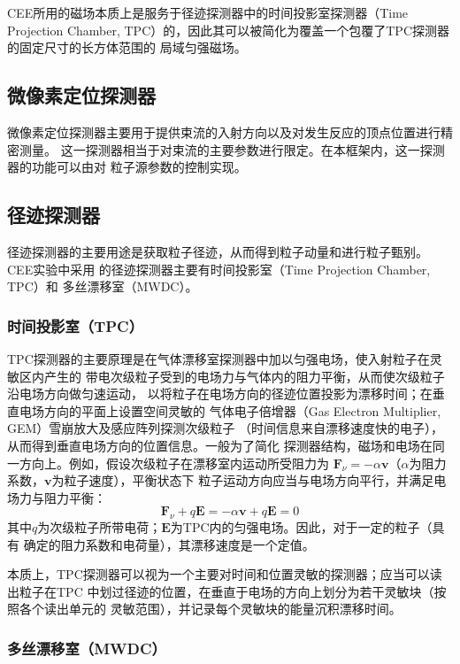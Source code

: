 \documentclass[bachelor,openany,oneside,color]{buaathesis}
\begin{document}
CEE所用的磁场本质上是服务于径迹探测器中的时间投影室探测器（Time Projection Chamber,
TPC）的，因此其可以被简化为覆盖一个包覆了TPC探测器的固定尺寸的长方体范围的
局域匀强磁场。

\subsection{微像素定位探测器}\label{ssec:det:track}

微像素定位探测器主要用于提供束流的入射方向以及对发生反应的顶点位置进行精密测量。
这一探测器相当于对束流的主要参数进行限定。在本框架内，这一探测器的功能可以由对
粒子源参数的控制实现。

\subsection{径迹探测器}

径迹探测器的主要用途是获取粒子径迹，从而得到粒子动量和进行粒子甄别。CEE实验中采用
的径迹探测器主要有时间投影室（Time Projection Chamber, TPC）和
多丝漂移室（MWDC）。

\subsubsection{时间投影室（TPC）}

TPC探测器的主要原理是在气体漂移室探测器中加以匀强电场，使入射粒子在灵敏区内产生的
带电次级粒子受到的电场力与气体内的阻力平衡，从而使次级粒子沿电场方向做匀速运动，
以将粒子在电场方向的径迹位置投影为漂移时间；在垂直电场方向的平面上设置空间灵敏的
气体电子倍增器（Gas Electron Multiplier, GEM）雪崩放大及感应阵列探测次级粒子
（时间信息来自漂移速度快的电子），从而得到垂直电场方向的位置信息。一般为了简化
探测器结构，磁场和电场在同一方向上。例如，假设次级粒子在漂移室内运动所受阻力为
$\bm{F}_\nu=-\alpha\bm{v}$（$\alpha$为阻力系数，$\bm{v}$为粒子速度），平衡状态下
粒子运动方向应当与电场方向平行，并满足电场力与阻力平衡：
\begin{equation}\label{eq:det:TPC:eq}
	\bm{F}_\nu+q\bm{E}=-\alpha\bm{v}+q\bm{E}=0
\end{equation}
其中$q$为次级粒子所带电荷；$\bm{E}$为TPC内的匀强电场。因此，对于一定的粒子（具有
确定的阻力系数和电荷量），其漂移速度是一个定值。

本质上，TPC探测器可以视为一个主要对时间和位置灵敏的探测器；应当可以读出粒子在TPC
中划过径迹的位置，在垂直于电场的方向上划分为若干灵敏块（按照各个读出单元的
灵敏范围），并记录每个灵敏块的能量沉积漂移时间。

\subsubsection{多丝漂移室（MWDC）}
\end{document}
